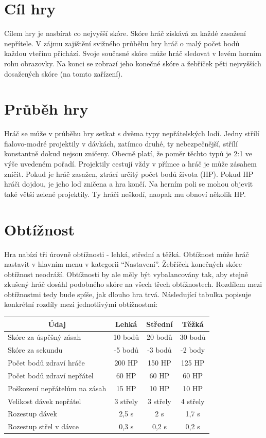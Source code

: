 \documentclass[12pt,a4paper,hidelinks]{article}
\begin{document}
\section{Cíl hry}
Cílem hry je nasbírat co nejvyšší skóre.
Skóre hráč získává za každé zasažení nepřítele. V zájmu zajištění svižného průběhu hry hráč o malý počet bodů každou vteřinu přichází.
Svoje současné skóre může hráč sledovat v levém horním rohu obrazovky. Na konci se zobrazí jeho konečné skóre a žebříček pěti nejvyšších dosažených skóre (na tomto zařízení).
\section{Průběh hry}
Hráč se může v průběhu hry setkat s dvěma typy nepřátelských lodí. Jedny střílí fialovo-modré projektily v dávkách, zatímco druhé, ty nebezpečnější, střílí konstantně dokud nejsou zničeny. Obecně platí, že poměr těchto typů je 2:1 ve výše uvedeném pořadí.
Projektily cestují vždy v přímce a hráč je může zásahem zničit. Pokud je hráč zasažen, ztrácí určitý počet bodů života (HP). Pokud HP hráči dojdou, je jeho loď zničena a hra končí.
Na herním poli se mohou objevit také větší zelené projektily. Ty hráči neškodí, naopak mu obnoví několik HP.
\section{Obtížnost}
Hra nabízí tři úrovně obtížnosti - lehká, střední a těžká. Obtížnost může hráč nastavit v hlavním menu v kategorii \enquote{Nastavení}.
Žebříček konečných skóre obtížnost neodráží. Obtížnosti by ale měly být vybalancovány tak, aby stejně zkušený hráč dosáhl podobného skóre na všech třech obtížnostech. Rozdílem mezi obtížnostmi tedy bude spíše, jak dlouho hra trvá.
Následující tabulka popisuje konkrétní rozdíly mezi jednotlivými obtížnostmi:
\begin{table}[h!]
\centering
\begin{tabular}{@{}l|ccc@{}}
\toprule
\multicolumn{1}{c|}{\textbf{Údaj}} & \textbf{Lehká} & \textbf{Střední} & \textbf{Těžká} \\ \midrule
Skóre za úspěšný zásah             & 10 bodů        & 20 bodů          & 30 bodů        \\
Skóre za sekundu                   & -5 bodů        & -3 bodů          & -2 body        \\
Počet bodů zdraví hráče            & 200 HP         & 150 HP           & 125 HP         \\
Počet bodů zdraví nepřátel         & 60 HP          & 60 HP            & 60 HP          \\
Poškození nepřátelům na zásah      & 15 HP          & 10 HP            & 10 HP          \\
Velikost dávek nepřátel            & 3 střely       & 3 střely         & 4 střely       \\
Rozestup dávek                     & 2,5 s          & 2 s              & 1,7 s          \\
Rozestup střel v dávce             & 0,3 s          & 0,2 s            & 0,2 s          \\ \bottomrule
\end{tabular}
\end{table}
\end{document}
